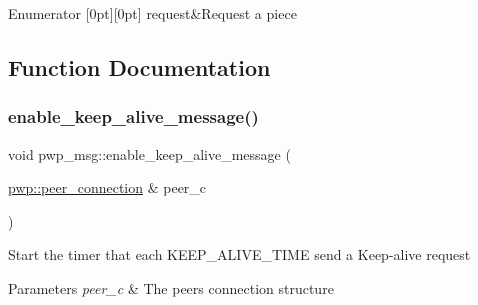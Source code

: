 \begin{DoxyEnumFields}{Enumerator}
[0pt][0pt]{}\mbox{\label{namespacepwp__msg_a0b9a29508f00a30e5138d2b78f4b1dafa4d6478c4fe948a9f3aa3ce8d09974370}} 
request&Request a piece \\
\hline

\end{DoxyEnumFields}


\subsection{Function Documentation}
\mbox{\label{namespacepwp__msg_a30c14bc06a8bb851ca79781cb9686b4f}} 
\subsubsection{\texorpdfstring{enable\+\_\+keep\+\_\+alive\+\_\+message()}{enable\_keep\_alive\_message()}}
{\footnotesize\ttfamily void pwp\+\_\+msg\+::enable\+\_\+keep\+\_\+alive\+\_\+message (\begin{DoxyParamCaption}\item[{\hyperlink{structpwp_1_1peer__connection}{pwp\+::peer\+\_\+connection} \&}]{peer\+\_\+c }\end{DoxyParamCaption})}

Start the timer that each K\+E\+E\+P\+\_\+\+A\+L\+I\+V\+E\+\_\+\+T\+I\+ME send a Keep-\/alive request


\begin{DoxyParams}{Parameters}
{\em peer\+\_\+c} & The peer\textquotesingle{}s connection structure \\
\hline
\end{DoxyParams}
\mbox{\label{namespacepwp__msg_aec35de04a2f2d9cb6abdd777917cfaae}} 
